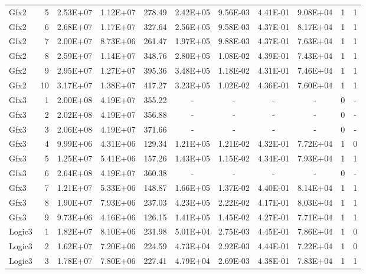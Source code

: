 \begin{longtable}{@{}l!{\vrule}r!{\vrule}c!{\vrule}c!{\vrule}c!{\vrule}c!{\vrule}c!{\vrule}c!{\vrule}c!{\vrule}c!{\vrule}c@{}}
Gfx2 & 5 & 2.53E+07 & 1.12E+07 & 278.49 & 2.42E+05 & 9.56E-03 & 4.41E-01 & 9.08E+04 & 1 & 1 \\
Gfx2 & 6 & 2.68E+07 & 1.17E+07 & 327.64 & 2.56E+05 & 9.58E-03 & 4.37E-01 & 8.17E+04 & 1 & 1 \\
Gfx2 & 7 & 2.00E+07 & 8.73E+06 & 261.47 & 1.97E+05 & 9.88E-03 & 4.37E-01 & 7.63E+04 & 1 & 1 \\
Gfx2 & 8 & 2.59E+07 & 1.14E+07 & 348.76 & 2.80E+05 & 1.08E-02 & 4.39E-01 & 7.43E+04 & 1 & 1 \\
Gfx2 & 9 & 2.95E+07 & 1.27E+07 & 395.36 & 3.48E+05 & 1.18E-02 & 4.31E-01 & 7.46E+04 & 1 & 1 \\
Gfx2 & 10 & 3.17E+07 & 1.38E+07 & 417.27 & 3.23E+05 & 1.02E-02 & 4.36E-01 & 7.60E+04 & 1 & 1 \\
\hline
{}
Gfx3 & 1 & 2.00E+08 & 4.19E+07 & 355.22 & - & - & - & - & 0 & - \\
Gfx3 & 2 & 2.02E+08 & 4.19E+07 & 356.88 & - & - & - & - & 0 & - \\
Gfx3 & 3 & 2.06E+08 & 4.19E+07 & 371.66 & - & - & - & - & 0 & - \\
Gfx3 & 4 & 9.99E+06 & 4.31E+06 & 129.34 & 1.21E+05 & 1.21E-02 & 4.32E-01 & 7.72E+04 & 1 & 0 \\
Gfx3 & 5 & 1.25E+07 & 5.41E+06 & 157.26 & 1.43E+05 & 1.15E-02 & 4.34E-01 & 7.93E+04 & 1 & 1 \\
Gfx3 & 6 & 2.64E+08 & 4.19E+07 & 360.38 & - & - & - & - & 0 & - \\
Gfx3 & 7 & 1.21E+07 & 5.33E+06 & 148.87 & 1.66E+05 & 1.37E-02 & 4.40E-01 & 8.14E+04 & 1 & 1 \\
Gfx3 & 8 & 1.90E+07 & 7.93E+06 & 237.03 & 4.23E+05 & 2.22E-02 & 4.17E-01 & 8.03E+04 & 1 & 1 \\
Gfx3 & 9 & 9.73E+06 & 4.16E+06 & 126.15 & 1.41E+05 & 1.45E-02 & 4.27E-01 & 7.71E+04 & 1 & 1 \\
\hline
Logic3 & 1 & 1.82E+07 & 8.10E+06 & 231.98 & 5.01E+04 & 2.75E-03 & 4.45E-01 & 7.86E+04 & 1 & 0 \\
Logic3 & 2 & 1.62E+07 & 7.20E+06 & 224.59 & 4.73E+04 & 2.92E-03 & 4.44E-01 & 7.22E+04 & 1 & 0 \\
Logic3 & 3 & 1.78E+07 & 7.80E+06 & 227.41 & 4.79E+04 & 2.69E-03 & 4.38E-01 & 7.83E+04 & 1 & 1 \\

\end{longtable}
